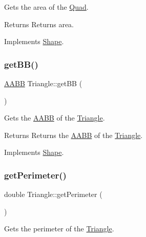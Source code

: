 Gets the area of the \mbox{\hyperlink{class_quad}{Quad}}. 

\begin{DoxyReturn}{Returns}
Returns area. 
\end{DoxyReturn}


Implements \mbox{\hyperlink{class_shape_acec2178598665e96b85f1ac6a13a47b9}{Shape}}.

\mbox{\label{class_triangle_a6f8c4358b9aa4de071618729547f4fd5}} 
\subsubsection{\texorpdfstring{getBB()}{getBB()}}
{\footnotesize\ttfamily \mbox{\hyperlink{class_a_a_b_b}{A\+A\+BB}} Triangle\+::get\+BB (\begin{DoxyParamCaption}{ }\end{DoxyParamCaption})\hspace{0.3cm}{\ttfamily [virtual]}}



Gets the \mbox{\hyperlink{class_a_a_b_b}{A\+A\+BB}} of the \mbox{\hyperlink{class_triangle}{Triangle}}. 

\begin{DoxyReturn}{Returns}
Returns the \mbox{\hyperlink{class_a_a_b_b}{A\+A\+BB}} of the \mbox{\hyperlink{class_triangle}{Triangle}}. 
\end{DoxyReturn}


Implements \mbox{\hyperlink{class_shape_a2490226328b30c113a7f07e2edda5f94}{Shape}}.

\mbox{\label{class_triangle_a692f12975e5a86c757f9d73c0228070e}} 
\subsubsection{\texorpdfstring{getPerimeter()}{getPerimeter()}}
{\footnotesize\ttfamily double Triangle\+::get\+Perimeter (\begin{DoxyParamCaption}{ }\end{DoxyParamCaption})\hspace{0.3cm}{\ttfamily [virtual]}}



Gets the perimeter of the \mbox{\hyperlink{class_triangle}{Triangle}}. 

